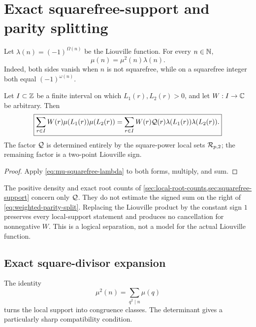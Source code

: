 \section{Exact squarefree-support and parity splitting}
\label{sec:parity-split}

Let \(\lambda(n)=(-1)^{\Omega(n)}\) be the Liouville function.  For
every \(n\in\mathbb N\),
\begin{equation}
 \boxed{\mu(n)=\mu^2(n)\lambda(n).}
\label{eq:mu-squarefree-lambda}
\end{equation}
Indeed, both sides vanish when \(n\) is not squarefree, while on a
squarefree integer both equal \((-1)^{\omega(n)}\).

\begin{theorem}
\label{thm:two-form-split}
Let \(I\subset\mathbb Z\) be a finite interval on which
\(L_1(r),L_2(r)>0\), and let \(W:I\to\mathbb C\) be arbitrary.  Then
\begin{equation}
 \boxed{
 \sum_{r\in I}W(r)\mu(L_1(r))\mu(L_2(r))
 =
 \sum_{r\in I}
 W(r)\mathcal Q(r)\lambda(L_1(r))\lambda(L_2(r)).}
\label{eq:weighted-parity-split}
\end{equation}
The factor \(\mathcal Q\) is determined entirely by the square-power local
sets \(\mathcal R_{p,2}\); the remaining factor is a two-point Liouville
sign.
\end{theorem}

\begin{proof}
Apply \eqref{eq:mu-squarefree-lambda} to both forms, multiply, and
sum.
\end{proof}

\begin{remark}
\label{rem:support-not-sign}
The positive density and exact root counts of
\cref{sec:local-root-counts,sec:squarefree-support} concern only
\(\mathcal Q\).  They do not estimate the signed sum on the right of
\eqref{eq:weighted-parity-split}.  Replacing the Liouville product by
the constant sign \(1\) preserves every local-support statement and
produces no cancellation for nonnegative \(W\).  This is a logical
separation, not a model for the actual Liouville function.
\end{remark}

\subsection{Exact square-divisor expansion}

The identity
\begin{equation}
 \mu^2(n)=\sum_{q^2\mid n}\mu(q)
\label{eq:squarefree-divisor-identity}
\end{equation}
turns the local support into congruence classes.  The determinant
gives a particularly sharp compatibility condition.

